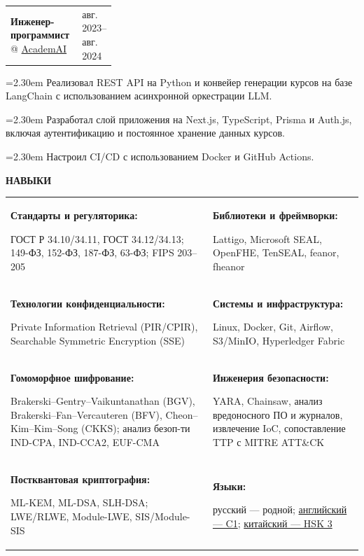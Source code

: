 \documentclass[11pt,a4paper]{article}
\makeatletter
\newcommand{\cvrow}[2]{%
  \noindent
  \begin{minipage}[t]{0.145\textwidth}
    \vspace{0pt}%
    \raggedright
    \fontsize{8.5}{10}\selectfont
    \bfseries\MakeUppercase{#1}
  \end{minipage}%
  \hfill
  \begin{minipage}[t]{0.835\textwidth}
    \vspace{0pt}%
    #2
  \end{minipage}\par
}
\newcommand{\skillcell}[2]{%
  \textbf{#1}\par
  #2
}
\newcommand{\workentry}[2]{%
  \noindent
  \begin{tabularx}{\linewidth}
    {@{}X@{\hspace{0.8em}}
    >{\raggedleft\arraybackslash}p{0.30\linewidth}@{}}
    #1 & \small #2
  \end{tabularx}\par
  \vspace{0.15em}
}
\newcommand{\workproject}[1]{%
  \noindent
  \hangindent=2.30em
  \hangafter=1
  \hspace*{1.15em}\makebox[1.15em][l]{$\diamond$}#1\par
  \vspace{0.12em}
}
\makeatother
\begin{document}
\vspace{0.50em}

\cvrow{}{%
  \workentry
    {\textbf{Инженер-программист} @ \href{https://academai.ru/}{AcademAI}}
    {авг. 2023--авг. 2024}

  \workproject{Реализовал REST API на Python и конвейер генерации курсов на базе LangChain
  с использованием асинхронной оркестрации LLM.}
  \workproject{Разработал слой приложения на Next.js, TypeScript,
  Prisma и Auth.js, включая аутентификацию и постоянное хранение данных курсов.}
  \workproject{Настроил CI/CD с использованием Docker и GitHub Actions.}
}

\vspace{0.75em}

\cvrow{Навыки}{%
  \begin{tabularx}{\linewidth}
    {@{}>{\raggedright\arraybackslash}X
    @{\hspace{1.2em}}
    >{\raggedright\arraybackslash}X@{}}

    \skillcell{Стандарты и регуляторика:}{%
      ГОСТ Р 34.10/34.11, ГОСТ 34.12/34.13;
      149-ФЗ, 152-ФЗ, 187-ФЗ, 63-ФЗ; FIPS 203--205}
    &
    \skillcell{Библиотеки и фреймворки:}{%
      Lattigo, Microsoft SEAL, OpenFHE, TenSEAL,
      feanor, fheanor}
    \\[0.20em]

    \skillcell{Технологии конфиденциальности:}{%
      Private Information Retrieval (PIR/CPIR),
      Searchable Symmetric Encryption (SSE)}
    &
    \skillcell{Системы и инфраструктура:}{%
      Linux, Docker, Git, Airflow, S3/MinIO,
      Hyperledger Fabric}
    \\[0.20em]

    \skillcell{Гомоморфное шифрование:}{%
      Brakerski--Gentry--Vaikuntanathan (BGV),
      Brakerski--Fan--Vercauteren (BFV),
      Cheon--Kim--Kim--Song (CKKS);
      анализ безоп-ти IND-CPA, IND-CCA2, EUF-CMA}
    &
    \skillcell{Инженерия безопасности:}{%
      YARA, Chainsaw, анализ вредоносного ПО и журналов,
      извлечение IoC, сопоставление TTP с MITRE ATT\&CK}
    \\[0.20em]

    \skillcell{Постквантовая криптография:}{%
      ML-KEM, ML-DSA, SLH-DSA;
      LWE/RLWE, Module-LWE, SIS/Module-SIS}
    &
    \skillcell{Языки:}{%
      русский --- родной;
      \href{https://iasenovets.github.io/files/toefl_8cd5f4a2b8ec8f34da49ea0faeef43f1.pdf}{английский --- C1};
    \href{https://admin.chinesetest.cn/queryScore.do?sid=c2tActR9Wb\%2704b861aefbdc5e9fd0b44afa717d08cbceb0720e582ce25f\%2724d7sWsQ5nVUQSwD}
        {китайский --- HSK 3}}
  \end{tabularx}
}
\end{document}
